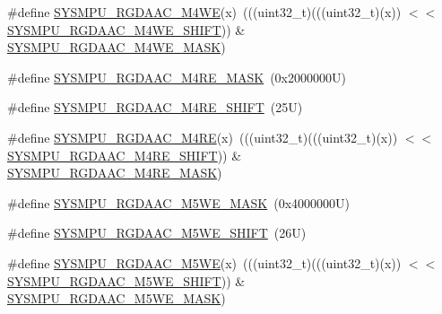 \begin{DoxyCompactItemize}
\item 
\#define \mbox{\hyperlink{group___s_y_s_m_p_u___register___masks_gae952a6d345807188cba4fd8d91f5d7b9}{S\+Y\+S\+M\+P\+U\+\_\+\+R\+G\+D\+A\+A\+C\+\_\+\+M4\+WE}}(x)~(((uint32\+\_\+t)(((uint32\+\_\+t)(x)) $<$$<$ \mbox{\hyperlink{group___s_y_s_m_p_u___register___masks_ga0fa0186c2648eb2d8c7eded2a95a603e}{S\+Y\+S\+M\+P\+U\+\_\+\+R\+G\+D\+A\+A\+C\+\_\+\+M4\+W\+E\+\_\+\+S\+H\+I\+FT}})) \& \mbox{\hyperlink{group___s_y_s_m_p_u___register___masks_gabb5f7c93ab93b88d2a8480f2ca8d8b92}{S\+Y\+S\+M\+P\+U\+\_\+\+R\+G\+D\+A\+A\+C\+\_\+\+M4\+W\+E\+\_\+\+M\+A\+SK}})
\item 
\#define \mbox{\hyperlink{group___s_y_s_m_p_u___register___masks_ga5c3ab9c31dac36964d9a42dc63cd0562}{S\+Y\+S\+M\+P\+U\+\_\+\+R\+G\+D\+A\+A\+C\+\_\+\+M4\+R\+E\+\_\+\+M\+A\+SK}}~(0x2000000\+U)
\item 
\#define \mbox{\hyperlink{group___s_y_s_m_p_u___register___masks_ga71acc537c1c212185803c2a5980b6b91}{S\+Y\+S\+M\+P\+U\+\_\+\+R\+G\+D\+A\+A\+C\+\_\+\+M4\+R\+E\+\_\+\+S\+H\+I\+FT}}~(25\+U)
\item 
\#define \mbox{\hyperlink{group___s_y_s_m_p_u___register___masks_ga6335cb3a5247ceb12dc7b507b735193a}{S\+Y\+S\+M\+P\+U\+\_\+\+R\+G\+D\+A\+A\+C\+\_\+\+M4\+RE}}(x)~(((uint32\+\_\+t)(((uint32\+\_\+t)(x)) $<$$<$ \mbox{\hyperlink{group___s_y_s_m_p_u___register___masks_ga71acc537c1c212185803c2a5980b6b91}{S\+Y\+S\+M\+P\+U\+\_\+\+R\+G\+D\+A\+A\+C\+\_\+\+M4\+R\+E\+\_\+\+S\+H\+I\+FT}})) \& \mbox{\hyperlink{group___s_y_s_m_p_u___register___masks_ga5c3ab9c31dac36964d9a42dc63cd0562}{S\+Y\+S\+M\+P\+U\+\_\+\+R\+G\+D\+A\+A\+C\+\_\+\+M4\+R\+E\+\_\+\+M\+A\+SK}})
\item 
\#define \mbox{\hyperlink{group___s_y_s_m_p_u___register___masks_gab07617f5450a0265dcbe82f887eaffc2}{S\+Y\+S\+M\+P\+U\+\_\+\+R\+G\+D\+A\+A\+C\+\_\+\+M5\+W\+E\+\_\+\+M\+A\+SK}}~(0x4000000\+U)
\item 
\#define \mbox{\hyperlink{group___s_y_s_m_p_u___register___masks_gaf466b78026a2e26a28f8d31e6906f255}{S\+Y\+S\+M\+P\+U\+\_\+\+R\+G\+D\+A\+A\+C\+\_\+\+M5\+W\+E\+\_\+\+S\+H\+I\+FT}}~(26\+U)
\item 
\#define \mbox{\hyperlink{group___s_y_s_m_p_u___register___masks_gaba51b621181f07712ad3ecf83f83fbf0}{S\+Y\+S\+M\+P\+U\+\_\+\+R\+G\+D\+A\+A\+C\+\_\+\+M5\+WE}}(x)~(((uint32\+\_\+t)(((uint32\+\_\+t)(x)) $<$$<$ \mbox{\hyperlink{group___s_y_s_m_p_u___register___masks_gaf466b78026a2e26a28f8d31e6906f255}{S\+Y\+S\+M\+P\+U\+\_\+\+R\+G\+D\+A\+A\+C\+\_\+\+M5\+W\+E\+\_\+\+S\+H\+I\+FT}})) \& \mbox{\hyperlink{group___s_y_s_m_p_u___register___masks_gab07617f5450a0265dcbe82f887eaffc2}{S\+Y\+S\+M\+P\+U\+\_\+\+R\+G\+D\+A\+A\+C\+\_\+\+M5\+W\+E\+\_\+\+M\+A\+SK}})
$$
\end{DoxyCompactItemize}
